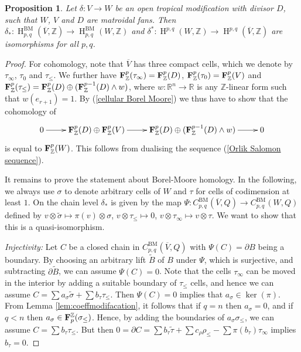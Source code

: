 \documentclass[11pt]{article}
\numberwithin{equation}{numsection}
\newcommand{\Z}{{\mathbb Z}}
\newcommand{\R}{{\mathbb R}}
\newcommand{\BF}{{\bf F}}
\newcommand{\clX}{\overline{V}}
\newcommand{\lift}[1]{\widetilde{#1}}
\newcommand{\bdry}[1]{#1_\infty}
\newcommand{\down}[1]{#1_\leq}
\DeclareMathOperator{\BM}{BM}
\DeclareMathOperator{\HH}{H}
\newtheorem{prop}[thm]{Proposition}
\begin{document}
\begin{prop}\label{prop:modarg}
Let $\delta \colon V \to W$ be an open tropical modification with divisor $D$, such that $W$, $V$ and $D$ are matroidal fans. 
Then $\delta_* \colon \HH_{p,q}^{\BM}(\overline{V}, \Z) \to \HH_{p,q}^{\BM}(W, \Z)$
and $\delta^* \colon \HH^{p,q}(W, \Z) \to \HH^{p,q}(\overline{V}, \Z)$ are isomorphisms for all $p,q$.
\end{prop}

\begin{proof}
For cohomology, note that $\overline{V}$ has three compact cells, 
which we denote by $\tau_\infty$, $\tau_0$ and $\tau_\leq$. 
We further have $\BF^p_{\Z}(\tau_\infty) = \BF_{\Z}^p(D)$, $\BF^p_{\Z}(\tau_0) = \BF^p_{\Z}(V)$ and 
$\BF^p_{\Z}(\tau_\leq) = \BF^p_{\Z}(D) \oplus (\BF^{p-1}_{\Z}(D) \wedge w)$,
where $w \colon \R^n \to \R$ is any $\Z$-linear form such that $w(e_{r+1}) = 1$.  
By (\ref{cellular Borel Moore}) we thus have to show that the cohomology of
\begin{align*}
\begin{xy}
\xymatrix{
0 \ar[r] &  \BF^p_\Z(D) \oplus \BF^p_\Z(V) \ar[r] & \BF^p_\Z(D) \oplus ( \BF^{p-1}_\Z(D) \wedge w ) \ar[r] & 0
}
\end{xy}
\end{align*}
is equal to $\BF^p_\Z(W)$. 
This follows from dualising the sequence (\ref{Orlik Salomon sequence}).


It remains to prove the statement about Borel-Moore homology. 
In the following, we always use $\sigma$ to denote arbitrary cells of $W$ and
$\tau$ for cells of codimension at least $1$. 
On the chain level 
$\delta_*$ is given by the map $\Psi \colon C_{p,q}^{\BM}(\clX, Q) \to C_{p,q}^{\BM}(W, Q)$
defined by $v \otimes \lift{\sigma} \mapsto \pi(v) \otimes \sigma$, 
$v \otimes \down{\tau} \mapsto 0$,
$v \otimes \bdry{\tau} \mapsto v \otimes \tau$.
We want to show that this is a quasi-isomorphism.

\emph{Injectivity:} 
Let $C$ be a closed chain in $C_{p,q}^{\text{BM}}(\clX, Q)$ with $\Psi(C) = \partial B$ being a boundary. 
By choosing an arbitrary lift $\lift{B}$ of $B$ under $\Psi$, which is surjective, 
and subtracting $\partial \lift{B}$, we can assume $\Psi(C) = 0$. 
Note that the cells $\bdry{\tau}$ can be moved in the interior by adding a suitable boundary of $\down{\tau}$ cells, 
and hence we can assume $C = \sum a_\sigma \lift{\sigma} + \sum b_\tau \down{\tau}$. 
Then $\Psi(C) = 0$ implies that $a_\sigma \in \ker(\pi)$. From Lemma \ref{lem:coeffmodifacation}, it follows that if $q = n$ then  $a_\sigma = 0$,  
and if $q < n$ then $a_\sigma \in {\bf F}_p^\Z(\down{\sigma})$.
Hence, by adding the boundaries of $a_\sigma \down{\sigma}$, we can assume $C = \sum b_\tau \down{\tau}$.
But then $0 = \partial C = \sum b_\tau \lift{\tau} + \sum c_\rho \down{\rho} - \sum \pi(b_\tau) \bdry{\tau}$ implies $b_\tau = 0$.


\end{proof}
\end{document}
